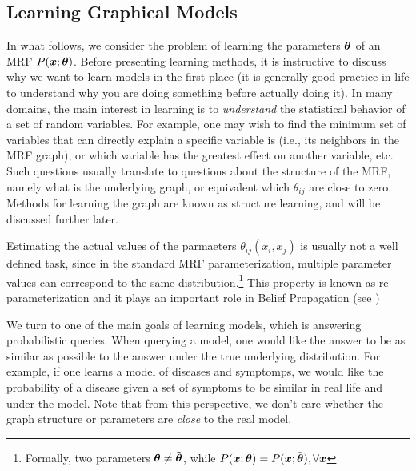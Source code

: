 \subsection{Learning Graphical Models}
\label{sec:learning}
In what follows, we consider the problem of learning the parameters $\boldsymbol{\theta}$ of an MRF $P(\boldsymbol{x};\boldsymbol{\theta})$. Before presenting learning methods, it is instructive to discuss why we want to learn models in the first place (it is generally good practice in life to understand why you are doing something before actually doing it). 
In many domains, the main interest in learning is to {\em understand} the statistical behavior of a set of random variables.
For example, one may wish to find the minimum set of variables that can directly explain a specific variable is (i.e., its neighbors in the MRF graph), or which variable has the greatest effect on another variable, etc. Such questions
usually translate to questions about the structure of the MRF, namely what 
is the underlying graph, or equivalent which $\theta_{ij}$ are close to zero. Methods for learning the graph are known as structure learning, and will be discussed further later. 


Estimating the actual values of the parmaeters $\theta_{ij}(x_i,x_j)$ is usually not a well defined task, since in the standard MRF parameterization, multiple 
parameter values can correspond to the same distribution.\footnote{Formally, two parameters $\boldsymbol{\theta} \neq \tilde{\boldsymbol{\theta}}$, while $P(\boldsymbol{x}; \boldsymbol{\theta}) = P(\boldsymbol{x}; \tilde{\boldsymbol{\theta}}), \forall \boldsymbol{x}$} This property is known as re-parameterization and it plays an important role in Belief Propagation (see )

We turn to one of the main goals of learning models, which is answering probabilistic queries. When querying a model, one would like the answer to be as similar as possible to the answer under the true underlying distribution.
For example, if one learns a model of diseases and symptomps, we would like the
probability of a disease given a set of symptoms to be similar in real life and under the model. Note that from this perspective, we don't care whether the graph 
structure or parameters are {\em close} to the real model. 

